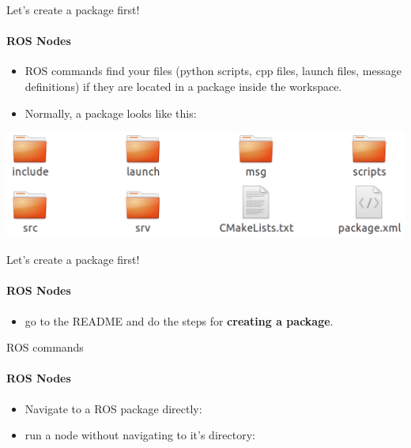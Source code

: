 \documentclass{beamer}
\begin{document}
\begin{frame}{Let's create a package first!}
    \framesubtitle{ROS Nodes}
\begin{itemize}
    \item ROS commands find your files (python scripts, cpp files, launch files, message definitions) if they are located in a package inside the workspace.
    
    \item Normally, a package looks like this:
 
\end{itemize}

\includegraphics[width = 1\linewidth]{figures/package.png}

\end{frame}

\begin{frame}{Let's create a package first!}
    \framesubtitle{ROS Nodes}

    \begin{itemize}
        \item  go to the README and do the steps for \textbf{creating a package}. 
    \end{itemize}   
\end{frame}


\begin{frame}{ROS commands}
    \framesubtitle{ROS Nodes}
\begin{itemize}
    \item Navigate to a ROS package directly:

    \begin{terminal}
        \color{green} 
    \end{terminal}
    
    \item run a node without navigating to it's directory:

    \begin{terminal}
        \color{green} 
    \end{terminal}
\end{itemize}

\end{frame}
\end{document}
